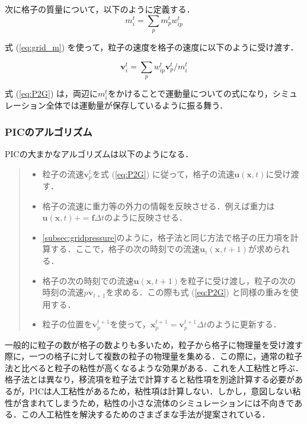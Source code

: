 \documentclass[a4j,12pt]{jreport}
\begin{document}
次に格子の質量について，以下のように定義する．
\begin{equation}\label{eq:grid_m}
m^t_i = \sum\limits_p m^t_pw^t_{ip}
\end{equation} 

式 (\ref{eq:grid_m}) を使って，粒子の速度を格子の速度に以下のように受け渡す．

\begin{equation}\label{eq:P2G}
\bm{v}^t_i = \sum\limits_p w^t_{ip}\bm{v}^t_p / m^t_i
\end{equation} 

式 (\ref{eq:P2G}) は，両辺に$m^t_i$をかけることで運動量についての式になり，シミュレーション全体では運動量が保存しているように振る舞う．

\subsubsection{PICのアルゴリズム} \label{subsec:PIC_algo}
PICの大まかなアルゴリズムは以下のようになる．
\begin{quote}
	\begin{itemize}
		\item 粒子の流速$\bm{v}^{t}_p$を式 (\ref{eq:P2G}) に従って，格子の流速$\bm{u} (\bm{x},t) $に受け渡す．
		\item 格子の流速に重力等の外力の情報を反映させる．例えば重力は$\bm{u} (\bm{x},t)  += \bm{f}\varDelta t$のように反映させる．
		\item \ref{subsec:gridpressure}のように，格子法と同じ方法で格子の圧力項を計算する．ここで，格子の次の時刻での流速$\bm{u}_t (\bm{x},t+1) $が求められる．
		\item 格子の次の時刻での流速$\bm{u} (\bm{x},t+1) $を粒子に受け渡し，粒子の次の時刻の流速$p\bm{v}_{t+1}$を求める．この際も式 (\ref{eq:P2G}) と同様の重みを使用する．
		\item 粒子の位置を$\bm{v}^{t+1}_p$を使って，$\bm{x}^{t+1}_p = \bm{v}^{t+1}_p\varDelta t $のように更新する．
	\end{itemize}
\end{quote}

一般的に粒子の数が格子の数よりも多いため，粒子から格子に物理量を受け渡す際に，一つの格子に対して複数の粒子の物理量を集める．この際に，通常の粒子法と比べると粒子の粘性が高くなるような効果がある．これを人工粘性と呼ぶ．格子法とは異なり，移流項を粒子法で計算すると粘性項を別途計算する必要があるが，PICは人工粘性があるため，粘性項は計算しない．しかし，意図しない粘性が含まれてしまうため，粘性の小さな流体のシミュレーションには不向きである．この人工粘性を解決するためのさまざまな手法が提案されている．
\end{document}
